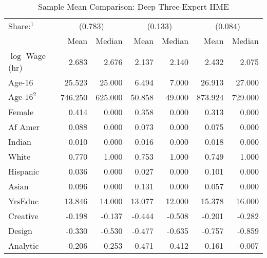 \documentclass[12pt]{article}
\theoremstyle{definition}
\begin{document}
\begin{landscape}
\begin{table}
\begin{threeparttable}
\begin{tablenotes}
          \end{tablenotes} \label{tbl:3D_full_regressions_results}
    
    
        \end{threeparttable}
    
    \end{table}
    \end{landscape}
  
  
    \begin{table} \centering
      \caption{Sample Mean Comparison: Deep Three-Expert HME}
      \begin{threeparttable}
        \begin{tabular}[l]{l r r r r r r}
      \cmidrule{1-7}
      Share:$^{1}$& \multicolumn{2}{c}{(0.783)} & \multicolumn{2}{c}{(0.133)} & \multicolumn{2}{c}{(0.084)} \\
                  & Mean & Median & Mean & Median & Mean & Median \\
      \cmidrule{1-7}
      $\log$ Wage (hr)      &   2.683 &   2.676 &  2.137 &  2.140 &   2.432 &   2.075 \\
      Age-16                &  25.523 &  25.000 &  6.494 &  7.000 &  26.913 &  27.000 \\
      $\textrm{Age-16}^{2}$ & 746.250 & 625.000 & 50.858 & 49.000 & 873.924 & 729.000 \\
      Female                &   0.414 &   0.000 &  0.358 &  0.000 &   0.313 &   0.000 \\
      Af Amer               &   0.088 &   0.000 &  0.073 &  0.000 &   0.075 &   0.000 \\
      Indian                &   0.010 &   0.000 &  0.016 &  0.000 &   0.018 &   0.000 \\
      White                 &   0.770 &   1.000 &  0.753 &  1.000 &   0.749 &   1.000 \\
      Hispanic              &   0.036 &   0.000 &  0.027 &  0.000 &   0.101 &   0.000 \\
      Asian                 &   0.096 &   0.000 &  0.131 &  0.000 &   0.057 &   0.000 \\
      YrsEduc               &  13.846 &  14.000 & 13.077 & 12.000 &  15.378 &  16.000 \\
      Creative              &  -0.198 &  -0.137 & -0.444 & -0.508 &  -0.201 &  -0.282 \\
      Design                &  -0.330 &  -0.530 & -0.477 & -0.635 &  -0.757 &  -0.859 \\
      Analytic              &  -0.206 &  -0.253 & -0.471 & -0.412 &  -0.161 &  -0.007 \\

\end{tabular}
\end{threeparttable}
\end{table}
\end{document}
